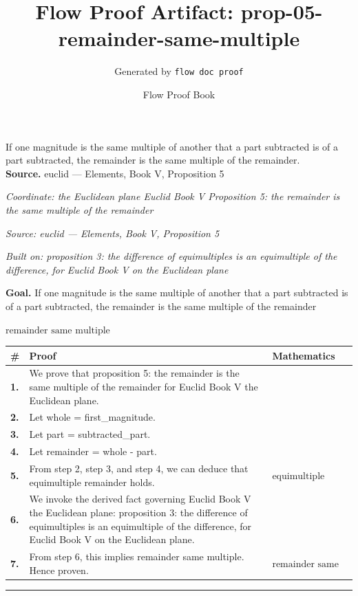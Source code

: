 \documentclass[11pt]{article}
\title{Flow Proof Artifact: prop-05-remainder-same-multiple}
\author{Generated by \texttt{flow doc proof}}
\date{Flow Proof Book}
\theoremstyle{definition}
\begin{document}
\maketitle
If one magnitude is the same multiple of another that a part subtracted is of a part subtracted, the remainder is the same multiple of the remainder.\\[0.5em]
\textbf{Source.} euclid — Elements, Book V, Proposition 5\\[0.5em]
\bigskip
{}\par
\smallskip\noindent\textit{Coordinate: the Euclidean plane \cdot Euclid Book V \cdot Proposition 5: the remainder is the same multiple of the remainder}\par
\smallskip\noindent\textit{Source: euclid — Elements, Book V, Proposition 5}\par
\smallskip\noindent\textit{Built on: proposition 3: the difference of equimultiples is an equimultiple of the difference, for Euclid Book V on the Euclidean plane}\par
\medskip
\noindent\textbf{Goal.} If one magnitude is the same multiple of another that a part subtracted is of a part subtracted, the remainder is the same multiple of the remainder\par
\noindent$\displaystyle \text{remainder same multiple}$\par
\medskip
\noindent
\begin{tabular}{@{} >{\raggedright\arraybackslash}p{} >{\raggedright\arraybackslash}p{} >{\raggedleft\arraybackslash}p{} @{}}
\textbf{\#} & \textbf{Proof} & \textbf{Mathematics} \\
\midrule
\textbf{1.} & We prove that proposition 5: the remainder is the same multiple of the remainder for Euclid Book V the Euclidean plane. & \\[0.45em]
\textbf{2.} & Let whole = first\_magnitude. & \\[0.45em]
\textbf{3.} & Let part = subtracted\_part. & \\[0.45em]
\textbf{4.} & Let remainder = whole - part. & \\[0.45em]
\textbf{5.} & From step 2, step 3, and step 4, we can deduce that equimultiple remainder holds. & $\displaystyle \text{equimultiple remainder holds}$ \\[0.45em]
\textbf{6.} & We invoke the derived fact governing Euclid Book V the Euclidean plane: proposition 3: the difference of equimultiples is an equimultiple of the difference, for Euclid Book V on the Euclidean plane. & \\[0.45em]
\textbf{7.} & From step 6, this implies remainder same multiple. Hence proven. & $\displaystyle \text{remainder same multiple}$ \\[0.45em]
\bottomrule
\end{tabular}
\label{thm:Geometry-Euclid Book V-proposition_5_the_remainder_is_the_same_multiple_of_the_remainder}
\par\medskip\hrule
\end{document}
